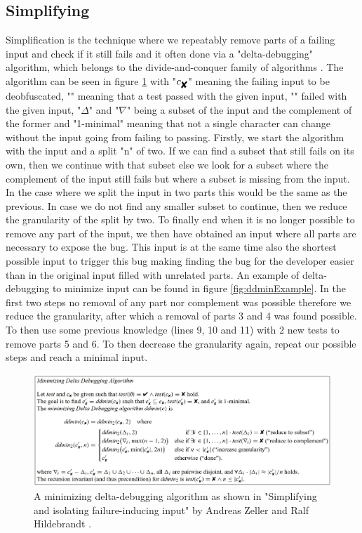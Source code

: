\subsection{Simplifying}
\label{inputReduction:Simplifying}
Simplification is the technique where we repeatably remove parts of a failing input and check if it still fails and it often done via a "delta-debugging" algorithm, which belongs to the divide-and-conquer family of algorithms \cite{2FuzzingAndDeltaDebuggingSMTSolvers}. 
The algorithm can be seen in figure \ref{fig:ddmin} with 
"$ c_{\mbox{\ding{56}}} $"  %
meaning the failing input to be deobfuscated,
"" %
meaning that a test passed with the given input,
"" %
failed with the given input, 
"$\Delta$" and "$\nabla$" being a subset of the input and the complement of the former and
"1-minimal" meaning that not a single character can change without the input going from failing to passing. Firstly, we start the algorithm with the input and a split "n" of two. If we can find a subset that still fails on its own, then we continue with that subset else we look for a subset where the complement of the input still fails but where a subset is missing from the input. In the case where we split the input in two parts this would be the same as the previous. In case we do not find any smaller subset to continue, then we reduce the granularity of the split by two. To finally end when it is no longer possible to remove any part of the input, we then have obtained an input where all parts are necessary to expose the bug. This input is at the same time also the shortest possible input to trigger this bug making finding the bug for the developer easier than in the original input filled with unrelated parts. 
An example of delta-debugging to minimize input can be found in figure \ref{fig:ddminExample}. In the first two steps no removal of any part nor complement was possible therefore we reduce the granularity, after which a removal of parts 3 and 4 was found possible. To then use some previous knowledge (lines 9, 10 and 11) with 2 new tests to remove parts 5 and 6. To then decrease the granularity again, repeat our possible steps and reach a minimal input.

\begin{figure}
	\centering
	\includegraphics[width=1.0\textwidth]{images/ddminFromPaper5edit}
	\caption{A minimizing delta-debugging algorithm as shown in "Simplifying and isolating failure-inducing input" by Andreas Zeller and Ralf Hildebrandt \cite{5zeller2002simplifyingIsolatingFailure-inducing}.}
	\label{fig:ddmin}
\end{figure}

